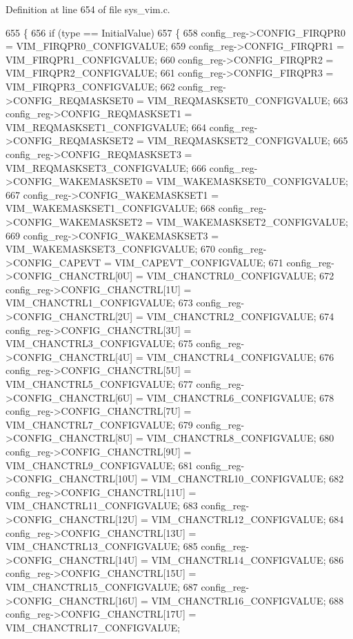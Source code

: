 Definition at line 654 of file sys\+\_\+vim.\+c.


\begin{DoxyCode}
655 \{  
656     \textcolor{keywordflow}{if} (type == InitialValue)
657     \{
658         config\_reg->CONFIG\_FIRQPR0 = VIM\_FIRQPR0\_CONFIGVALUE;
659         config\_reg->CONFIG\_FIRQPR1 = VIM\_FIRQPR1\_CONFIGVALUE;
660         config\_reg->CONFIG\_FIRQPR2 = VIM\_FIRQPR2\_CONFIGVALUE;
661         config\_reg->CONFIG\_FIRQPR3 = VIM\_FIRQPR3\_CONFIGVALUE;
662         config\_reg->CONFIG\_REQMASKSET0 = VIM\_REQMASKSET0\_CONFIGVALUE;
663         config\_reg->CONFIG\_REQMASKSET1 = VIM\_REQMASKSET1\_CONFIGVALUE;
664         config\_reg->CONFIG\_REQMASKSET2 = VIM\_REQMASKSET2\_CONFIGVALUE;
665         config\_reg->CONFIG\_REQMASKSET3 = VIM\_REQMASKSET3\_CONFIGVALUE;
666         config\_reg->CONFIG\_WAKEMASKSET0 = VIM\_WAKEMASKSET0\_CONFIGVALUE;
667         config\_reg->CONFIG\_WAKEMASKSET1 = VIM\_WAKEMASKSET1\_CONFIGVALUE;
668         config\_reg->CONFIG\_WAKEMASKSET2 = VIM\_WAKEMASKSET2\_CONFIGVALUE;
669         config\_reg->CONFIG\_WAKEMASKSET3 = VIM\_WAKEMASKSET3\_CONFIGVALUE;
670         config\_reg->CONFIG\_CAPEVT = VIM\_CAPEVT\_CONFIGVALUE;
671         config\_reg->CONFIG\_CHANCTRL[0U] = VIM\_CHANCTRL0\_CONFIGVALUE;
672         config\_reg->CONFIG\_CHANCTRL[1U] = VIM\_CHANCTRL1\_CONFIGVALUE;
673         config\_reg->CONFIG\_CHANCTRL[2U] = VIM\_CHANCTRL2\_CONFIGVALUE;
674         config\_reg->CONFIG\_CHANCTRL[3U] = VIM\_CHANCTRL3\_CONFIGVALUE;
675         config\_reg->CONFIG\_CHANCTRL[4U] = VIM\_CHANCTRL4\_CONFIGVALUE;
676         config\_reg->CONFIG\_CHANCTRL[5U] = VIM\_CHANCTRL5\_CONFIGVALUE;
677         config\_reg->CONFIG\_CHANCTRL[6U] = VIM\_CHANCTRL6\_CONFIGVALUE;
678         config\_reg->CONFIG\_CHANCTRL[7U] = VIM\_CHANCTRL7\_CONFIGVALUE;
679         config\_reg->CONFIG\_CHANCTRL[8U] = VIM\_CHANCTRL8\_CONFIGVALUE;
680         config\_reg->CONFIG\_CHANCTRL[9U] = VIM\_CHANCTRL9\_CONFIGVALUE;
681         config\_reg->CONFIG\_CHANCTRL[10U] = VIM\_CHANCTRL10\_CONFIGVALUE;
682         config\_reg->CONFIG\_CHANCTRL[11U] = VIM\_CHANCTRL11\_CONFIGVALUE;
683         config\_reg->CONFIG\_CHANCTRL[12U] = VIM\_CHANCTRL12\_CONFIGVALUE;
684         config\_reg->CONFIG\_CHANCTRL[13U] = VIM\_CHANCTRL13\_CONFIGVALUE;
685         config\_reg->CONFIG\_CHANCTRL[14U] = VIM\_CHANCTRL14\_CONFIGVALUE;
686         config\_reg->CONFIG\_CHANCTRL[15U] = VIM\_CHANCTRL15\_CONFIGVALUE;
687         config\_reg->CONFIG\_CHANCTRL[16U] = VIM\_CHANCTRL16\_CONFIGVALUE;
688         config\_reg->CONFIG\_CHANCTRL[17U] = VIM\_CHANCTRL17\_CONFIGVALUE;

\end{DoxyCode}
